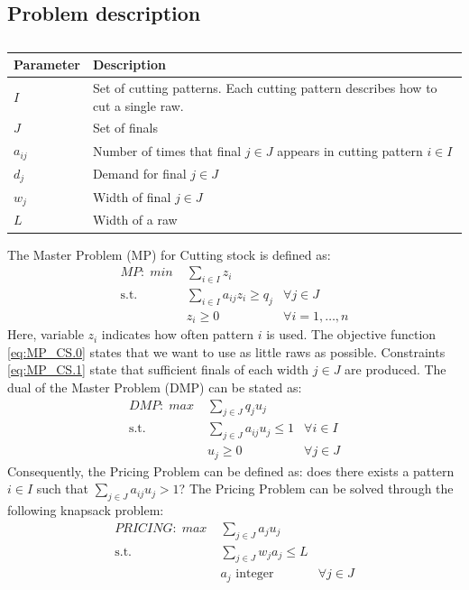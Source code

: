 \documentclass[a4paper]{article}
\begin{document}
\subsection{Problem description}
\begin{table}[ht]
\begin{tabular}{ll}
\toprule
\textbf{Parameter} 	& \textbf{Description}\\
\midrule
$I$		& Set of cutting patterns. Each cutting pattern describes how to cut a single raw.\\
$J$		& Set of finals\\
$a_{ij}$		& Number of times that final $j\in J$ appears in cutting pattern $i\in I$\\
$d_j$		& Demand for final $j\in J$\\
$w_j$		& Width of final $j\in J$\\
$L$		& Width of a raw\\
\bottomrule
\end{tabular}
\caption{}
\label{tbl:cutting_stock} 
\end{table}

The Master Problem (MP) for Cutting stock is defined as:
\begin{align}
\label{eq:MP_CS.0} \mathit{MP:}\; min\; &\sum_{i\in I} z_i &\\
\label{eq:MP_CS.1} \mbox{s.t. }&\sum_{i \in I} a_{ij}z_i\geq q_j & \forall j\in J\\
\label{eq:MP_CS.2} &z_i\geq 0 &\forall i=1,\dots,n
\end{align}
Here, variable $z_i$ indicates how often pattern $i$ is used. The objective function \eqref{eq:MP_CS.0} states that we want to use as little raws as possible. Constraints \eqref{eq:MP_CS.1} state that sufficient finals of each width $j\in J$ are produced. The dual of the Master Problem (DMP) can be stated as:
\begin{align}
\label{eq:DMP_CS.0} \mathit{DMP:}\; max\; &\sum_{j\in J} q_ju_j &\\
\label{eq:DMP_CS.1} \mbox{s.t. }&\sum_{j\in J} a_{ij}u_j\leq 1 & \forall i\in I\\
\label{eq:DMP_CS.2} &u_j\geq 0 &\forall j\in J
\end{align}
Consequently, the Pricing Problem can be defined as: does there exists a pattern $i\in I$ such that $\sum_{j\in J}a_{ij}u_j>1$? The Pricing Problem can be solved through the following knapsack problem:
\begin{align}
\label{eq:PRICE_CS.0} \mathit{PRICING:}\; max\; &\sum_{j\in J} a_ju_j &\\
\label{eq:PRICE_CS.1} \mbox{s.t. }&\sum_{j\in J} w_ja_j\leq L & \\
\label{eq:PRICE_CS.2} &a_j\mbox{ integer} &\forall j\in J
\end{align}
\end{document}
